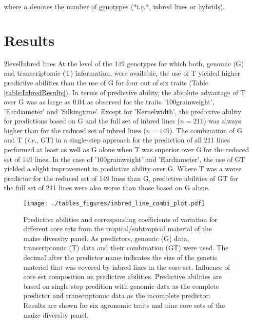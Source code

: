 \documentclass[12pt,titlepage]{article}
\begin{document}
where $n$ denotes the number of genotypes (*i.e.*, inbred lines or hybrids).












\section*{Results}
\Genetics2level{Inbred lines}
At the level of the 149 genotypes for which both, genomic (G) and 
transcriptomic (T) information, were available, the use of T yielded higher
predictive abilities than the use of G for four out of six traits
(Table \ref{table:InbredResults}).
In terms of predictive ability, the absolute advantage of T over G was as large 
as 0.04 as observed for the traits '100grainweight', 'Eardiameter' and 
'Silkingtime'.
Except for 'Kernelwidth', the predictive ability for predictions based on
G and the full set of inbred lines ($n = 211$) was always higher than for the 
reduced set of inbred lines ($n = 149$).
The combination of G and T (\textit{i.e.}, GT) in a single-step approach for the 
prediction of all 211 lines performed at least as well as G alone when T was 
superior over G for the reduced set of 149 lines.
In the case of '100grainweight' and 'Eardiameter', the use of GT yielded a 
slight improvement in predictive ability over G.
Where T was a worse predictor for the reduced set of 149 lines than G,
predictive abilities of GT for the full set of 211 lines were also worse than 
those based on G alone.

\begin{figure}[H]
  \centering
  \texttt{[image: ./tables\_figures/inbred\_line\_combi\_plot.pdf]}
  \caption{
  Predictive abilities and corresponding coefficients of variation for 
  different core sets from the tropical/subtropical material of the maize 
  diversity panel.
  As predictors, genomic (G) data, transcriptomic (T) data and their 
  combination (GT) were used.
  The decimal after the predictor name indicates the size of the genetic 
  material that was covered by inbred lines in the core set.
  Influence of core set composition on predictive abilities.
  Predictive abilities are based on single step predition with genomic data as the 
  complete predictor and transcriptomic data as the incomplete predictor.
  Results are shown for six agronomic traits and nine core sets of the maize 
  diversity panel.
  } 
  \label{fig:InbredResults}
\end{figure}
\end{document}
